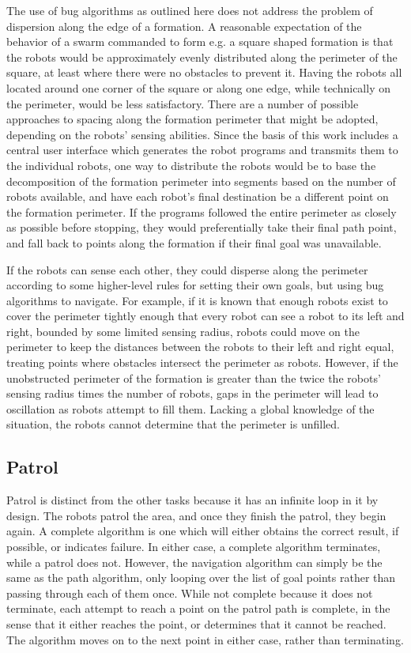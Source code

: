 The use of bug algorithms as outlined here does not address the problem of dispersion along the edge of a formation. 
A reasonable expectation of the behavior of a swarm commanded to form e.g. a square shaped formation is that the robots would be approximately evenly distributed along the perimeter of the square, at least where there were no obstacles to prevent it. 
Having the robots all located around one corner of the square or along one edge, while technically on the perimeter, would be less satisfactory. 
There are a number of possible approaches to spacing along the formation perimeter that might be adopted, depending on the robots' sensing abilities.
Since the basis of this work includes a central user interface which generates the robot programs and transmits them to the individual robots, one way to distribute the robots would be to base the decomposition of the formation perimeter into segments based on the number of robots available, and have each robot's final destination be a different point on the formation perimeter. 
If the programs followed the entire perimeter as closely as possible before stopping, they would preferentially take their final path point, and fall back to points along the formation if their final goal was unavailable.

If the robots can sense each other, they could disperse along the perimeter according to some higher-level rules for setting their own goals, but using bug algorithms to navigate. 
For example, if it is known that enough robots exist to cover the perimeter tightly enough that every robot can see a robot to its left and right, bounded by some limited sensing radius, robots could move on the perimeter to keep the distances between the robots to their left and right equal, treating points where obstacles intersect the perimeter as robots.
However, if the unobstructed perimeter of the formation is greater than the twice the robots' sensing radius times the number of robots, gaps in the perimeter will lead to oscillation as robots attempt to fill them. 
Lacking a global knowledge of the situation, the robots cannot determine that the perimeter is unfilled. 

\subsection{Patrol}

Patrol is distinct from the other tasks because it has an infinite loop in it by design. The robots patrol the area, and once they finish the patrol, they begin again. 
A complete algorithm is one which will either obtains the correct result, if possible, or indicates failure. 
In either case, a complete algorithm terminates, while a patrol does not. 
However, the navigation algorithm can simply be the same as the path algorithm, only looping over the list of goal points rather than passing through each of them once. 
While not complete because it does not terminate, each attempt to reach a point on the patrol path is complete, in the sense that it either reaches the point, or determines that it cannot be reached. 
The algorithm moves on to the next point in either case, rather than terminating. 

